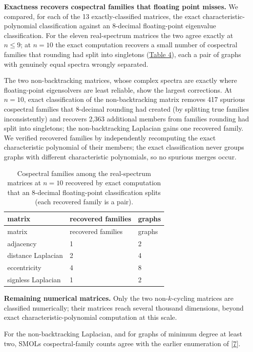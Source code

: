 \documentclass[
]{article}
\begin{document}
\textbf{Exactness recovers cospectral families that floating point
misses.} We compared, for each of the 13 exactly-classified matrices,
the exact characteristic-polynomial classification against an 8-decimal
floating-point eigenvalue classification. For the eleven real-spectrum
matrices the two agree exactly at \(n \le 9\); at \(n = 10\) the exact
computation recovers a small number of cospectral families that rounding
had split into singletons (\hyperref[tbl-recovered]{Table 4}), each a
pair of graphs with genuinely equal spectra wrongly separated.

The two non-backtracking matrices, whose complex spectra are exactly
where floating-point eigensolvers are least reliable, show the largest
corrections. At \(n = 10\), exact classification of the non-backtracking
matrix removes 417 spurious cospectral families that 8-decimal rounding
had created (by splitting true families inconsistently) and recovers
2,363 additional members from families rounding had split into
singletons; the non-backtracking Laplacian gains one recovered family.
We verified recovered families by independently recomputing the exact
characteristic polynomial of their members; the exact classification
never groups graphs with different characteristic polynomials, so no
spurious merges occur.

\begin{longtable}[]{@{}lll@{}}
\caption{Cospectral families among the real-spectrum matrices at
\(n = 10\) recovered by exact computation that an 8-decimal
floating-point classification splits (each recovered family is a
pair).}\label{tbl-recovered}\tabularnewline
\toprule\noalign{}
matrix & recovered families & graphs \\
\midrule\noalign{}
\endfirsthead
\toprule\noalign{}
matrix & recovered families & graphs \\
\midrule\noalign{}
\endhead
\bottomrule\noalign{}
\endlastfoot
adjacency & 1 & 2 \\
distance Laplacian & 2 & 4 \\
eccentricity & 4 & 8 \\
signless Laplacian & 1 & 2 \\
\end{longtable}

\textbf{Remaining numerical matrices.} Only the two non-\(k\)-cycling
matrices are classified numerically; their matrices reach several
thousand dimensions, beyond exact characteristic-polynomial computation
at this scale.

For the non-backtracking Laplacian, and for graphs of minimum degree at
least two, SMOL\textquotesingle s cospectral-family counts agree with
the earlier enumeration of {[}\hyperref[ref-jost2023]{7}{]}.
\end{document}
